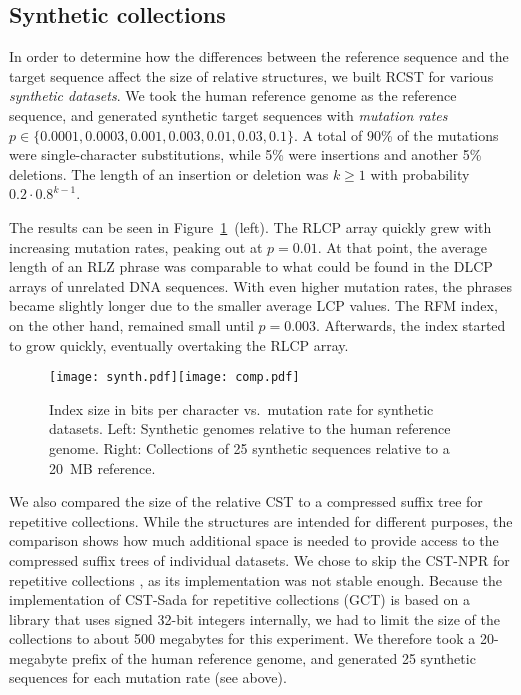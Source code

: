 \documentclass[a4paper,11pt]{llncs}
\newcommand{\set}[1]{\ensuremath{\{ #1 \}}}
\newcommand{\CST}{\textsf{CST}}
\newcommand{\CSTsada}{\textsf{CST\nobreakdash-Sada}}
\newcommand{\GCT}{\textsf{GCT}}
\newcommand{\CSTnpr}{\textsf{CST\nobreakdash-NPR}}
\newcommand{\RCST}{\textsf{RCST}}
\newcommand{\RFM}{\textsf{RFM}}
\newcommand{\LCP}{\textsf{LCP}}
\newcommand{\DLCP}{\textsf{DLCP}}
\newcommand{\RLCP}{\textsf{RLCP}}
\newcommand{\RLZ}{\textsf{RLZ}}
\begin{document}
\subsection{Synthetic collections}

In order to determine how the differences between the reference sequence and
the target sequence affect the size of relative structures, we built \RCST{}
for various \emph{synthetic datasets}. We took the human reference genome as
the reference sequence, and generated synthetic target sequences with
\emph{mutation rates} $p \in \set{0.0001, 0.0003, 0.001, 0.003, 0.01, 0.03,
0.1}$. A total of 90\% of the mutations were single-character substitutions,
while 5\% were insertions and another 5\% deletions. The length of an
insertion or deletion was $k \ge 1$ with probability $0.2 \cdot 0.8^{k-1}$.

The results can be seen in Figure~\ref{fig:synthetic}~(left). The \RLCP{}
array quickly grew with increasing mutation rates, peaking out at $p = 0.01$.
At that point, the average length of an \RLZ{} phrase was comparable to what
could be found in the \DLCP{} arrays of unrelated DNA sequences. With even
higher mutation rates, the phrases became slightly longer due to the smaller
average \LCP{} values. The \RFM{} index, on the other hand, remained small
until $p = 0.003$. Afterwards, the index started to grow quickly, eventually
overtaking the \RLCP{} array.

\begin{figure}
\begin{center}
\texttt{[image: synth.pdf]}\hspace{-0.4in}\texttt{[image: comp.pdf]}
\end{center}
\caption{Index size in bits per character vs.~mutation rate for synthetic
datasets. Left: Synthetic genomes relative to the human reference genome.
Right: Collections of 25 synthetic sequences relative to a 20~MB
reference.}\label{fig:synthetic}
\end{figure}

We also compared the size of the relative \CST{} to a compressed suffix tree
for repetitive collections. While the structures are intended for different
purposes, the comparison shows how much additional space is needed to provide
access to the compressed suffix trees of individual datasets. We chose to skip
the \CSTnpr{} for repetitive collections \cite{Abeliuk2013}, as its
implementation was not stable enough. Because the implementation of \CSTsada{}
for repetitive collections (\GCT) \cite{Navarro2014} is based on a library
that uses signed 32\nobreakdash-bit integers internally, we had to limit the
size of the collections to about 500 megabytes for this experiment. We
therefore took a 20\nobreakdash-megabyte prefix of the human reference genome,
and generated 25 synthetic sequences for each mutation rate (see above).
\end{document}
